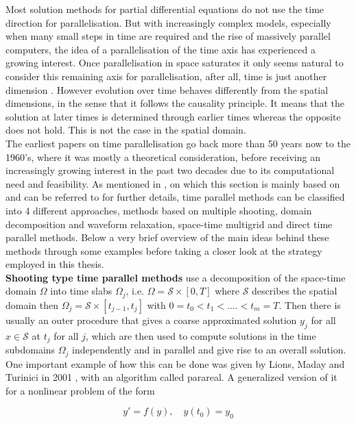 \documentclass[../draft_1.tex]{subfiles}
\begin{document}
Most solution methods for partial differential equations  do not use the time direction for parallelisation. But with increasingly complex models, especially when many small steps in time are required and the rise of massively parallel computers, the idea of a parallelisation of the time axis has experienced a growing interest. Once parallelisation in space saturates it only seems natural to consider this remaining axis for parallelisation, after all, time is just another dimension \cite{gander201550}. However evolution over time behaves differently from the spatial dimensions, in the sense that it follows the causality principle. It means that the solution at later times is determined through earlier times whereas the opposite does not hold. This is not the case in the spatial domain. 
\smallskip
\\ 
The earliest papers on time parallelisation go back more than 50 years now to the 1960's, where it was mostly a theoretical consideration, before receiving an increasingly growing interest in the past two decades due to its computational need and feasibility. As mentioned in \cite{gander201550}, on which this section is mainly based on and can be referred to for further details, time parallel methods can be classified into 4 different approaches, methods based on multiple shooting, domain decomposition and waveform relaxation, space-time multigrid and direct time parallel methods. Below a very brief overview of the main ideas behind these methods through some examples before taking a closer look at the strategy employed in this thesis. 
\smallskip
\\
\textbf{Shooting type time parallel methods} use a decomposition of the space-time domain $\Omega$ into time slabs $\Omega_j$, i.e. $\Omega = \mathcal{S} \times [0, T]$  where $\mathcal{S}$ describes the spatial domain then $ \Omega_j =  \mathcal{S} \times [t_{j-1}, t_j]$ with $0 = t_0 < t_1 < .... < t_m = T$. Then there is usually an outer procedure that gives a coarse approximated solution $y_j$ for all $ x \in \mathcal{S}$ at $t_j$ for all $j$, which are then used to compute solutions in the time subdomains $\Omega_j$ independently and in parallel and give rise to an overall solution. One important example of how this can be done was given by Lions, Maday and Turinici in 2001 \cite{lions2001resolutionions2001resolution}, with an algorithm called parareal. A generalized version of it for a nonlinear problem of the form
\begin{ceqn}
	\begin{equation}
	\label{space_time_ode}
	y' = f(y), \quad y(t_0) = y_0
	\end{equation}
\end{ceqn}
\end{document}
